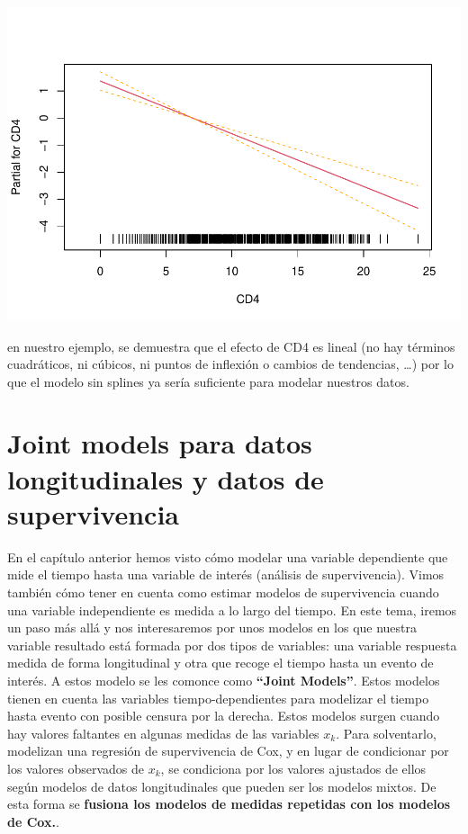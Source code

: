 \documentclass[
]{book}
\begin{document}
\includegraphics{fig_out/unnamed-chunk-168-1.pdf}

en nuestro ejemplo, se demuestra que el efecto de CD4 es lineal (no hay términos cuadráticos, ni cúbicos, ni puntos de inflexión o cambios de tendencias, \ldots) por lo que el modelo sin splines ya sería suficiente para modelar nuestros datos.

\hypertarget{joint-models-para-datos-longitudinales-y-datos-de-supervivencia}{%
\chapter{Joint models para datos longitudinales y datos de supervivencia}\label{joint-models-para-datos-longitudinales-y-datos-de-supervivencia}}

En el capítulo anterior hemos visto cómo modelar una variable dependiente que mide el tiempo hasta una variable de interés (análisis de supervivencia). Vimos también cómo tener en cuenta como estimar modelos de supervivencia cuando una variable independiente es medida a lo largo del tiempo. En este tema, iremos un paso más allá y nos interesaremos por unos modelos en los que nuestra variable resultado está formada por dos tipos de variables: una variable respuesta medida de forma longitudinal y otra que recoge el tiempo hasta un evento de interés. A estos modelo se les comonce como \textbf{``Joint Models''}. Estos modelos tienen en cuenta las variables tiempo-dependientes para modelizar el tiempo hasta evento con posible censura por la derecha. Estos modelos surgen cuando hay valores faltantes en algunas medidas de las variables \(x_k\). Para solventarlo, modelizan una regresión de supervivencia de Cox, y en lugar de condicionar por los valores observados de \(x_k\), se condiciona por los valores ajustados de ellos según modelos de datos longitudinales que pueden ser los modelos mixtos. De esta forma se \textbf{fusiona los modelos de medidas repetidas con los modelos de Cox.}.
\end{document}
